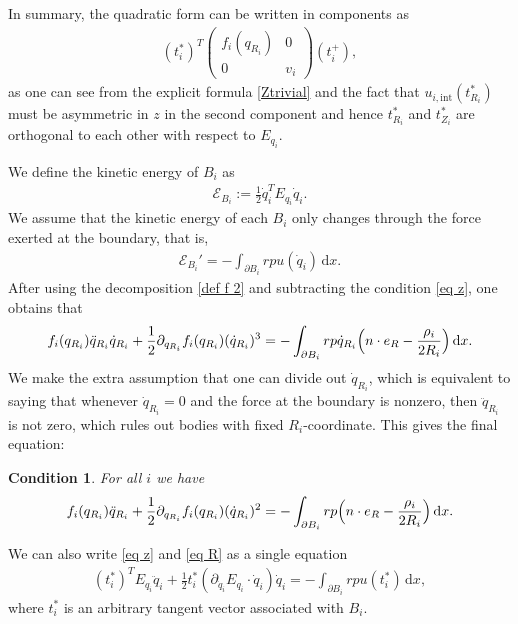 \documentclass[JEP,XML,SOM,Unicode,published]{cedram}
\newtheorem{condition}[theorem]{Condition}
\theoremstyle{definition}
\newcommand\eq{=}
\newcommand\dd{\,\mathrm{d}}
\newcommand\dx{\dd x}
\let\de\partial
\begin{document}
In summary, the quadratic form can be written in components as
\begin{align}
(t_i^*)^T\begin{pmatrix} f_i(q_{R_i}) & 0\\ 0 & v_i\end{pmatrix}(t_i^+),\label{def f 2}
\end{align}
as one can see from the explicit formula \eqref{Ztrivial} and the fact that $u_{i,\mathrm{int}}(t_{R_i}^*)$ must be asymmetric in $z$ in the second component and hence $t_{R_i}^*$ and $t_{Z_i}^*$ are orthogonal to each other with respect to $E_{q_i}$.

We define the kinetic energy of $B_i$ as
\begin{align}\label{intEnergy}
\mathcal{E}_{B_i}:=\frac{1}{2}\dot{q}_i^TE_{q_i}\dot{q}_i.
\end{align}
We assume that the kinetic energy of each $B_i$ only changes through the force exerted at the boundary, that is,
\begin{align}
\mathcal{E}_{B_i}'\eq-\int_{\de B_i} rpu(\dot{q}_i)\dx.\label{energyBalance}
\end{align}
After using the decomposition \eqref{def f 2} and subtracting the condition \eqref{eq z}, one obtains that
\begin{align*}%
f_i(q_{R_i})\ddot{q}_{R_i}\dot{q}_{R_i}+\frac{1}{2}\de_{q_{R_i}}f_i(q_{R_i})(\dot{q}_{R_i})^3\eq -\int_{\de B_i}r p\dot{q}_{R_i}\Bigl(n\cdot e_R -\frac{\rho_i}{2R_i}\Bigr)\dx.
\end{align*}
We make the extra assumption that one can divide out $\dot{q}_{R_i}$, which is equivalent to saying that whenever $\dot{q}_{R_i}=0$ and the force at the boundary is nonzero, then $\ddot{q}_{R_i}$ is not zero, which rules out bodies with fixed $R_i$-coordinate. This gives the final equation:
\begin{condition}
For all $i$ we have
\begin{align}\label{eq R}
f_i(q_{R_i})\ddot{q}_{R_i}+\frac{1}{2}\de_{q_{R_i}}f_i(q_{R_i})(\dot{q}_{R_i})^2\eq -\int_{\de B_i}r p \Bigl(n\cdot e_R -\frac{\rho_i}{2R_i} \Bigr)\dx.
\end{align}
\end{condition}

We can also write \eqref{eq z} and \eqref{eq R} as a single equation
\begin{align}\label{2ndDeri}
(t_i^*)^TE_{q_i}\ddot{q}_i+\frac{1}{2}t_i^*(\de_{\dot{q}_i} E_{q_i}\cdot \dot{q}_i)\dot{q}_i\eq-\int_{\de B_i} rpu(t_i^*)\dx,
\end{align}
where $t_i^*$ is an arbitrary tangent vector associated with $B_i$.
\end{document}
